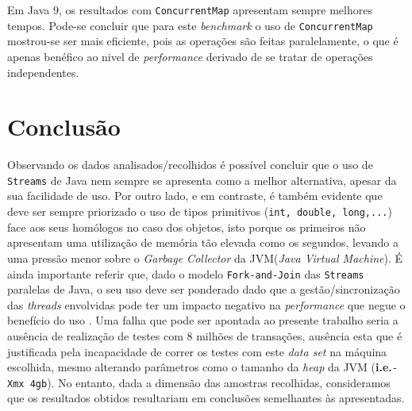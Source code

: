 \documentclass{article}
\begin{document}
Em Java 9, os resultados com \texttt{ConcurrentMap} apresentam sempre melhores tempos.
Pode-se concluir que para este \textit{benchmark} o uso de \texttt{ConcurrentMap} mostrou-se ser mais eficiente, pois as operações são feitas paralelamente, o que é apenas benéfico ao nivel de \textit{performance} derivado de se tratar de operações independentes.

\section{Conclusão}
Observando os dados analisados/recolhidos é possível concluir que o uso de \texttt{Streams} de Java nem sempre se apresenta como a melhor alternativa, apesar da sua facilidade de uso. Por outro lado, e em contraste, é também evidente que deve ser sempre priorizado o uso de tipos primitivos (\texttt{int, double, long,...}) face 
aos seus homólogos no caso dos objetos, isto porque os primeiros não apresentam uma utilização de memória tão elevada como os segundos, levando a uma pressão menor 
sobre o \textit{Garbage Collector} da JVM(\textit{Java Virtual Machine}). É ainda importante referir que, dado o modelo \texttt{Fork-and-Join} das \texttt{Streams} 
paralelas de Java, o seu uso deve ser ponderado dado que a gestão/sincronização das \textit{threads} envolvidas pode ter um impacto negativo na \textit{performance} que negue o benefício do uso \cite{parallel_considerations}.
Uma falha que pode ser apontada ao presente trabalho seria a ausência de realização de testes com 8 milhões de transações, ausência esta que é justificada pela 
incapacidade de correr os testes com este \textit{data set} na máquina escolhida, mesmo alterando parâmetros como o tamanho da \textit{heap} da JVM
(\textbf{i.e.}\texttt{-Xmx 4gb}). No entanto, dada a dimensão das amostras recolhidas, consideramos que os resultados obtidos resultariam em conclusões semelhantes às
apresentadas.

\printbibliography
\end{document}
